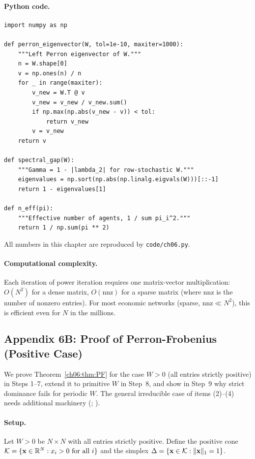 \documentclass[../structural_economics_book.tex]{subfiles}
\begin{document}
\paragraph{Python code.}
\begin{verbatim}
import numpy as np

def perron_eigenvector(W, tol=1e-10, maxiter=1000):
    """Left Perron eigenvector of W."""
    n = W.shape[0]
    v = np.ones(n) / n
    for _ in range(maxiter):
        v_new = W.T @ v
        v_new = v_new / v_new.sum()
        if np.max(np.abs(v_new - v)) < tol:
            return v_new
        v = v_new
    return v

def spectral_gap(W):
    """Gamma = 1 - |lambda_2| for row-stochastic W."""
    eigenvalues = np.sort(np.abs(np.linalg.eigvals(W)))[::-1]
    return 1 - eigenvalues[1]

def n_eff(pi):
    """Effective number of agents, 1 / sum pi_i^2."""
    return 1 / np.sum(pi ** 2)
\end{verbatim}
All numbers in this chapter are reproduced by \texttt{code/ch06.py}.

\paragraph{Computational complexity.} Each iteration of power iteration requires one matrix-vector multiplication: $O(N^2)$ for a dense matrix, $O(\text{nnz})$ for a sparse matrix (where $\text{nnz}$ is the number of nonzero entries). For most economic networks (sparse, $\text{nnz} \ll N^2$), this is efficient even for $N$ in the millions.


\subsection*{Appendix 6B: Proof of Perron-Frobenius (Positive Case)}
\label{ch06:app:PF_proof}

We prove Theorem~\ref{ch06:thm:PF} for the case $W > 0$ (all entries strictly positive) in Steps 1--7, extend it to primitive $W$ in Step~8, and show in Step~9 why strict dominance fails for periodic $W$. The general irreducible case of items (2)--(4) needs additional machinery (\citealp[Thm.~1.5]{seneta2006nonnegative}; \citealp[Thm.~8.4.4]{horn2012matrix}).

\paragraph{Setup.} Let $W > 0$ be $N \times N$ with all entries strictly positive. Define the positive cone $\mathcal{K} = \{\mathbf{x} \in \mathbb{R}^N : x_i > 0 \text{ for all } i\}$ and the simplex $\Delta = \{\mathbf{x} \in \mathcal{K} : \|\mathbf{x}\|_1 = 1\}$.
\end{document}
